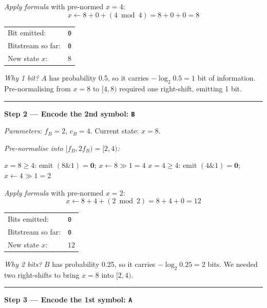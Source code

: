 \begin{examplebox}
\noindent\emph{Apply formula} with pre-normed $x = 4$:
\[
  x \leftarrow 8 + 0 + (4 \bmod 4) = 8 + 0 + 0 = 8
\]

\begin{center}
\begin{tabular}{@{}ll@{}}
  Bit emitted:      & \texttt{0} \\
  Bitstream so far: & \texttt{0} \\
  New state $x$:    & $8$ \\
\end{tabular}
\end{center}

\noindent\textit{Why 1 bit?}  $A$ has probability 0.5, so it
carries $-\log_2 0.5 = 1$ bit of information.  Pre-normalising
from $x=8$ to $[4,8)$ required one right-shift, emitting 1
bit.

\medskip\hrule\medskip

\noindent\textbf{Step 2 --- Encode the 2nd symbol: \texttt{B}}

\noindent\emph{Parameters:} $f_B = 2$, $c_B = 4$.
Current state: $x = 8$.

\noindent\emph{Pre-normalise into $[f_B, 2f_B) = [2, 4)$:}
\begin{algorithmic}[1]
    \State $x = 8 \ge 4$: \enspace emit $(8 \mathrel{\&} 1) = \mathbf{0}$;\enspace
           $x \leftarrow 8 \gg 1 = 4$
    \State $x = 4 \ge 4$: \enspace emit $(4 \mathrel{\&} 1) = \mathbf{0}$;\enspace
           $x \leftarrow 4 \gg 1 = 2$
\EndWhile
\Comment{$2 \in [2,4)$: stop}
\end{algorithmic}

\noindent\emph{Apply formula} with pre-normed $x = 2$:
\[
  x \leftarrow 8 + 4 + (2 \bmod 2) = 8 + 4 + 0 = 12
\]

\begin{center}
\begin{tabular}{@{}ll@{}}
  Bits emitted:     & \texttt{0\;0} \\
  Bitstream so far: & \texttt{0\;0\;0} \\
  New state $x$:    & $12$ \\
\end{tabular}
\end{center}

\noindent\textit{Why 2 bits?}  $B$ has probability 0.25, so
it carries $-\log_2 0.25 = 2$ bits.  We needed two
right-shifts to bring $x = 8$ into $[2, 4)$.

\medskip\hrule\medskip

\noindent\textbf{Step 3 --- Encode the 1st symbol: \texttt{A}}


\end{examplebox}
